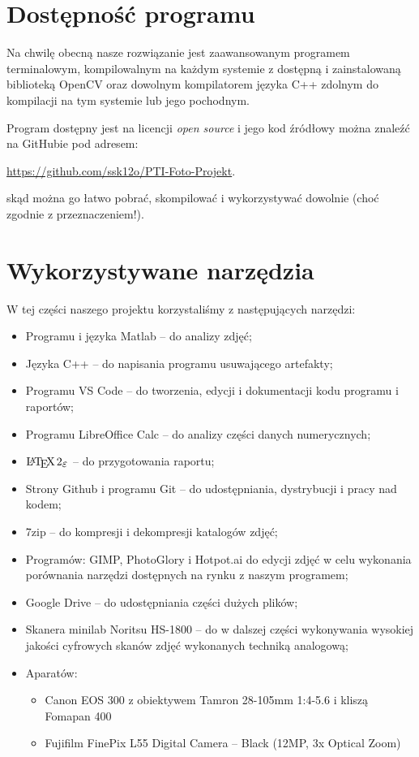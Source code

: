 \documentclass[]{mwart}
\begin{document}
\newpage
\section{Dostępność programu}
Na chwilę obecną nasze rozwiązanie jest zaawansowanym programem terminalowym,
kompilowalnym na każdym systemie z dostępną i zainstalowaną biblioteką OpenCV oraz
dowolnym kompilatorem języka C++ zdolnym do kompilacji na tym systemie lub jego pochodnym.

Program dostępny jest na licencji \textit{open source} i jego kod źródłowy można znaleźć na GitHubie
pod adresem:
\begin{center}
    \url{https://github.com/ssk12o/PTI-Foto-Projekt}.
\end{center}
skąd można go łatwo pobrać, skompilować i wykorzystywać dowolnie (choć zgodnie z przeznaczeniem!).




\section{Wykorzystywane narzędzia}
W tej części naszego projektu korzystaliśmy z następujących narzędzi:

\begin{itemize}
    \item Programu i języka Matlab -- do analizy zdjęć;
    \item Języka C++ -- do napisania programu usuwającego artefakty;
    \item Programu VS Code -- do tworzenia, edycji i dokumentacji kodu programu i raportów;
    \item Programu LibreOffice Calc -- do analizy części danych numerycznych;
    \item $\LaTeXe{}$ -- do przygotowania raportu;
    \item Strony Github i programu Git -- do udostępniania, dystrybucji i pracy nad kodem;
    \item 7zip -- do kompresji i dekompresji katalogów zdjęć;
    \item Programów: GIMP, PhotoGlory i Hotpot.ai do edycji zdjęć w celu wykonania porównania narzędzi dostępnych na rynku z naszym programem;
    \item Google Drive -- do udostępniania części dużych plików;
    \item Skanera minilab Noritsu HS-1800 -- do w dalszej części wykonywania wysokiej jakości cyfrowych skanów zdjęć wykonanych techniką analogową;
    \item Aparatów:
          \begin{itemize}
              \item Canon EOS 300 z obiektywem Tamron 28-105mm 1:4-5.6 i kliszą Fomapan 400
              \item Fujifilm FinePix L55 Digital Camera -- Black (12MP, 3x Optical Zoom)
          \end{itemize}
\end{itemize}
\end{document}
